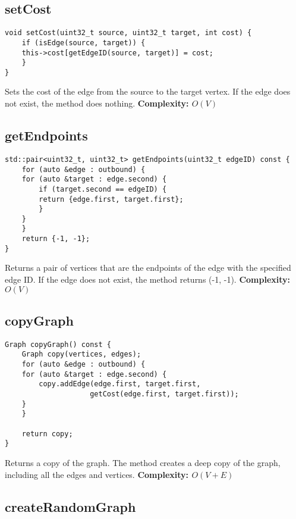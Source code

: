 \documentclass{article}
\begin{document}
\subsection*{setCost}

\begin{verbatim}
void setCost(uint32_t source, uint32_t target, int cost) {
    if (isEdge(source, target)) {
    this->cost[getEdgeID(source, target)] = cost;
    }
}
\end{verbatim}
Sets the cost of the edge from the source to the target vertex. If the edge does not exist, the method does nothing.
\textbf{Complexity: $O(V)$}

\subsection*{getEndpoints}

\begin{verbatim}
std::pair<uint32_t, uint32_t> getEndpoints(uint32_t edgeID) const {
    for (auto &edge : outbound) {
    for (auto &target : edge.second) {
        if (target.second == edgeID) {
        return {edge.first, target.first};
        }
    }
    }
    return {-1, -1};
}
\end{verbatim}
Returns a pair of vertices that are the endpoints of the edge with the specified edge ID. If the edge does not exist, the method returns (-1, -1).
\textbf{Complexity: $O(V)$}

\subsection*{copyGraph}

\begin{verbatim}
Graph copyGraph() const {
    Graph copy(vertices, edges);
    for (auto &edge : outbound) {
    for (auto &target : edge.second) {
        copy.addEdge(edge.first, target.first,
                    getCost(edge.first, target.first));
    }
    }

    return copy;
}
\end{verbatim}
Returns a copy of the graph. The method creates a deep copy of the graph, including all the edges and vertices.
\textbf{Complexity: $O(V + E)$}

\subsection*{createRandomGraph}
\end{document}
